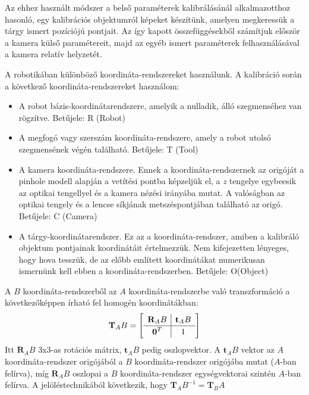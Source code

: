 	Az ehhez használt módszer a belső paraméterek kalibrálásánál alkalmazotthoz hasonló, egy kalibrációs objektumról képeket készítünk, amelyen megkeressük a tárgy ismert pozíciójú pontjait. Az így kapott összefüggésekből számítjuk először a kamera külső paramétereit, majd az egyéb ismert paraméterek felhasználásával a kamera relatív helyzetét.	
	
	 A robotikában különböző koordináta-rendszereket használunk. A kalibráció során a következő koordináta-rendszereket használom:
	\begin{itemize}
	\item A robot bázis-koordinátarendszere, amelyik a nulladik, álló szegmenséhez van rögzítve. Betűjele: R (Robot)	
	\item A megfogó vagy szerszám koordináta-rendszere, amely a robot utolsó szegmensének végén található. Betűjele: T (Tool)
	\item A kamera koordináta-rendszere. Ennek a koordináta-rendszernek az origóját a pinhole modell alapján a vetítési pontba képzeljük el, a \textit{z} tengelye egybeesik az optikai tengellyel és a kamera nézési irányába mutat. A valóságban az optikai tengely és a lencse síkjának metszéspontjában található az origó. Betűjele: C (Camera)
	\item A tárgy-koordinátarendszer. Ez az a koordináta-rendszer, amiben a kalibráló objektum pontjainak koordinátáit értelmezzük. Nem kifejezetten lényeges, hogy hova tesszük, de az előbb említett koordinátákat numerikusan ismernünk kell ebben a koordináta-rendszerben. Betűjele: O(Object)
	\end{itemize}
	
	A $B$ koordináta-rendszerből az $A$ koordináta-rendszerbe való transzformáció a következőképpen írható fel homogén koordinátákban:
	\begin{equation}
	\label{trf-kifejt}
	\mathbf{T}_AB = 
	\left[
	\def\arraystretch{1.2}
	\begin{array}{c|c}
 	\mathbf{R}_AB & \mathbf{t}_AB \\
 	\hline
	\mathbf{0}^T & 1 \\
	\end{array}	
	\right]
	\end{equation}
	Itt $\mathbf{R}_AB$ 3x3-as rotációs mátrix, $\mathbf{t}_AB$ pedig oszlopvektor. A $\mathbf{t}_AB$ vektor az $A$ koordináta-rendszer origójából a $B$ koordináta-rendszer origójába mutat ($A$-ban felírva), míg $\mathbf{R}_AB$ oszlopai a $B$ koordináta-rendszer egységvektorai szintén $A$-ban felírva.
	A jelöléstechnikából következik, hogy $\mathbf{T}_AB^{-1} = \mathbf{T}_BA$
	
